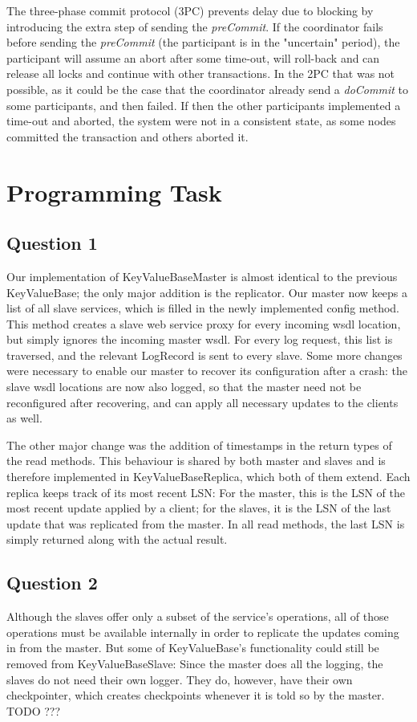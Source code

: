 \documentclass[12pt,a4paper,fleqn]{article}
\begin{document}
The three-phase commit protocol (3PC) prevents delay due to blocking by introducing the extra step of sending the \emph{preCommit}. If the coordinator fails before sending the \emph{preCommit} (the participant is in the "uncertain" period), the participant will assume an abort after some time-out, will roll-back and can release all locks and continue with other transactions. In the 2PC that was not possible, as it could be the case that the coordinator already send a \emph{doCommit} to some participants, and then failed. If then the other participants implemented a time-out and aborted, the system were not in a consistent state, as some nodes committed the transaction and others aborted it.

\section*{Programming Task} 
\label{sec:programming}

\subsection*{Question 1}
\label{sec:pq1}

Our implementation of KeyValueBaseMaster is almost identical to the previous KeyValueBase; the only major addition is the replicator. Our master now keeps a list of all slave services, which is filled in the newly implemented config method. This method creates a slave web service proxy for every incoming wsdl location, but simply ignores the incoming master wsdl. For every log request, this list is traversed, and the relevant LogRecord is sent to every slave. Some more changes were necessary to enable our master to recover its configuration after a crash: the slave wsdl locations are now also logged, so that the master need not be reconfigured after recovering, and can apply all necessary updates to the clients as well. 

The other major change was the addition of timestamps in the return types of the read methods. This behaviour is shared by both master and slaves and is therefore implemented in KeyValueBaseReplica, which both of them extend. Each replica keeps track of its most recent LSN: For the master, this is the LSN of the most recent update applied by a client; for the slaves, it is the LSN of the last update that was replicated from the master. In all read methods, the last LSN is simply returned along with the actual result.

\subsection*{Question 2}
\label{sec:pq2}
Although the slaves offer only a subset of the service's operations, all of those operations must be available internally in order to replicate the updates coming in from the master. But some of KeyValueBase's functionality could still be removed from KeyValueBaseSlave: Since the master does all the logging, the slaves do not need their own logger. They do, however, have their own checkpointer, which creates checkpoints whenever it is told so by the master. TODO ???
\end{document}
